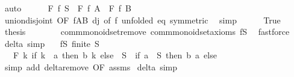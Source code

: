\begin{isabellebody}
\ auto\isanewline
\ \ \ \ \isamarkupfalse%
\ {\isachardoublequoteopen}F\ {\isacharquery}{\kern0pt}f\ S\ {\isacharequal}{\kern0pt}\ F\ {\isacharquery}{\kern0pt}f\ {\isacharquery}{\kern0pt}A\ \isactrlbold {\isacharasterisk}{\kern0pt}\ F\ {\isacharquery}{\kern0pt}f\ {\isacharquery}{\kern0pt}B{\isachardoublequoteclose}\isanewline
\ \ \ \ \ \ \isamarkupfalse%
\ union{\isacharunderscore}{\kern0pt}disjoint\ {\isacharbrackleft}{\kern0pt}OF\ fAB\ dj{\isacharcomma}{\kern0pt}\ of\ {\isacharquery}{\kern0pt}f{\isacharcomma}{\kern0pt}\ unfolded\ eq\ {\isacharbrackleft}{\kern0pt}symmetric{\isacharbrackright}{\kern0pt}{\isacharbrackright}{\kern0pt}\ \isamarkupfalse%
\ simp\isanewline
\ \ \ \ \isamarkupfalse%
\ True\ \isamarkupfalse%
\ {\isacharquery}{\kern0pt}thesis\isanewline
\ \ \ \ \ \ \isamarkupfalse%
\ comm{\isacharunderscore}{\kern0pt}monoid{\isacharunderscore}{\kern0pt}set{\isachardot}{\kern0pt}remove\ comm{\isacharunderscore}{\kern0pt}monoid{\isacharunderscore}{\kern0pt}set{\isacharunderscore}{\kern0pt}axioms\ fS\ \isamarkupfalse%
\ fastforce\isanewline
\ \ \isamarkupfalse%
\isanewline
{}\isamarkupfalse%
%
\endisatagproof
{\isafoldproof}%
%
\isadelimproof
\isanewline
%
\endisadelimproof
\isanewline
{}\isamarkupfalse%
\ delta\ {\isacharbrackleft}{\kern0pt}simp{\isacharbrackright}{\kern0pt}{\isacharcolon}{\kern0pt}\isanewline
\ \ \ fS{\isacharcolon}{\kern0pt}\ {\isachardoublequoteopen}finite\ S{\isachardoublequoteclose}\isanewline
\ \ \ {\isachardoublequoteopen}F\ {\isacharparenleft}{\kern0pt}{\isasymlambda}k{\isachardot}{\kern0pt}\ if\ k\ {\isacharequal}{\kern0pt}\ a\ then\ b\ k\ else\ \ S\ {\isacharequal}{\kern0pt}\ {\isacharparenleft}{\kern0pt}if\ a\ {\isasymin}\ S\ then\ b\ a\ else\ \isanewline
%
\isadelimproof
\ \ %
\endisadelimproof
%
\isatagproof
{}\isamarkupfalse%
\ {\isacharparenleft}{\kern0pt}simp\ add{\isacharcolon}{\kern0pt}\ delta{\isacharunderscore}{\kern0pt}remove\ {\isacharbrackleft}{\kern0pt}OF\ assms{\isacharbrackright}{\kern0pt}{\isacharparenright}{\kern0pt}%
\endisatagproof
{\isafoldproof}%
%
\isadelimproof
\isanewline
%
\endisadelimproof
\isanewline
{}\isamarkupfalse%
\ delta{\isacharprime}{\kern0pt}\ {\isacharbrackleft}{\kern0pt}simp{\isacharbrackright}{\kern0pt}{\isacharcolon}{\kern0pt}\isanewline

\end{isabellebody}
